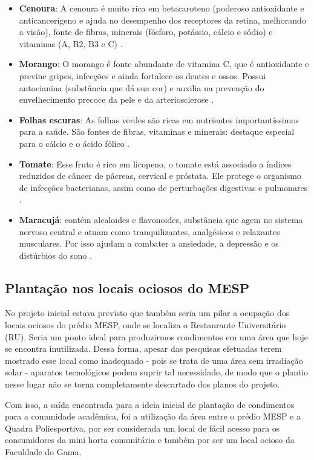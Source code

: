   \begin{itemize}
    \item \textbf{Cenoura}: A cenoura é muito rica em betacaroteno (poderoso antioxidante e anticancerígeno e ajuda no desempenho dos
      receptores da retina, melhorando a visão), fonte de fibras, minerais (fósforo, potássio, cálcio e sódio) e vitaminas (A, B2, B3 e C) \cite{nutricao2}.
    \item \textbf{Morango}: O morango é fonte abundante de vitamina C, que é antioxidante e previne gripes, infecções e ainda fortalece os
      dentes e ossos. Possui antocianina (subst\^{a}ncia que dá sua cor) e auxilia na prevenção do envelhecimento precoce da pele e da
      arteriosclerose \cite{nutricao3}.
    \item \textbf{Folhas escuras}: As folhas verdes são ricas em nutrientes importantíssimos para a saúde. São fontes de fibras, vitaminas
      e minerais: destaque especial para o cálcio e o ácido fólico \cite{nutricao4, nutricao5}.
  \item \textbf{Tomate}: Esse fruto é rico em licopeno, o tomate está associado a índices reduzidos de c\^{a}ncer de p\^{a}creas,
      cervical e próstata. Ele protege o organismo de infecções bacterianas, assim como de perturbações digestivas e pulmonares \cite{nutricao5}.
    \item \textbf{Maracujá}: contém alcaloides e flavonoides, subst\^{a}ncia que agem no sistema nervoso central e atuam como tranquilizantes,
      analgésicos e relaxantes musculares. Por isso ajudam a combater a ansiedade, a depressão e os distúrbios do sono \cite{nutricao12}.
  \end{itemize}

\subsection{Plantação nos locais ociosos do MESP}

  No projeto inicial estava previsto que também seria um pilar a ocupação dos locais ociosos do prédio MESP, onde se localiza o
  Restaurante Universitário (RU). Seria um ponto ideal para produzirmos condimentos em uma área que hoje se encontra inutilizada.
  Dessa forma, apesar das pesquisas efetuadas terem mostrado esse local como inadequado - pois se trata de uma área sem irradiação solar - aparatos tecnológicos podem suprir tal necessidade, de modo que o plantio nesse lugar não se torna completamente descartado dos planos do projeto.

  Com isso, a saída encontrada para a ideia inicial de plantação de condimentos para a comunidade acadêmica, foi a utilização da área
  entre o prédio MESP e a Quadra Poliesportiva, por ser considerada um local de fácil acesso para os consumidores da mini horta
  comunitária e também por ser um local ocioso da Faculdade do Gama.

